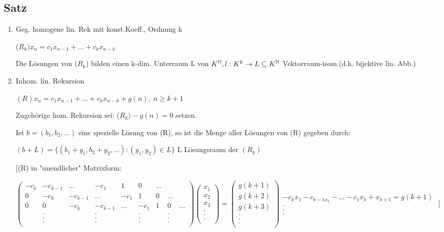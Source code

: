 \subsection{Satz} %
\begin{enumerate}
	\item Geg. homogene lin. Rek mit konst.Koeff., Ordnung k
	
	($R_k) x_n=c_1x_{n-1}+...+c_kx_{n-k}$
	
	Die Lösungen von ($R_k$) bilden einen k-dim. Unterraum L von $K^{\operatorname{\mathbb{N}}}, l:K^k \rightarrow L \subseteq K^{\operatorname{\mathbb{N}}} $ Vektorraum-isom.(d.h. bijektive lin. Abb.)
	
	\item Inhom. lin. Rekursion
	
	$(R)x_n=c_1x_{n-1}+...+c_kx_{n-k}+g(n),~ n\geq k+1$
	
	Zugehörige hom. Rekursion sei: ($R_k)-g(n)=0$ setzen.
	
	Ist $b=(b_1,b_2,...)$ eine spezielle Lösung von (R), so ist die Menge aller Lösungen von (R) gegeben durch:
	
	$(b+L)=\{(b_1+y_1,b_2+y_2,...):(y_1,y_2) \in L \}$ \qquad L Lösungsraum der $(R_k)$
	
	[(R) in "unendlicher" Matrixform:
	
	$\begin{pmatrix}
	-c_k & -c_{k-1} & ... & -c_1 & 1 & 0 &... & & \\
	0&-c_k & -c_{k-1} & ... & -c_1 & 1 & 0 &... &\\
	0&0&-c_k & -c_{k-1} & ... & -c_1 & 1 & 0 &... \\
	&.&&.&&.&&.&\\
	&.&&.&&.&&.&\\
	&.&&.&&.&&.&\\
	\end{pmatrix}
	\begin{pmatrix}
	x_1\\
	x_2\\
	x_3\\
	.\\
	.\\
	.\\
	\end{pmatrix} = 
	\begin{pmatrix}
	g(k+1)\\
	g(k+2)\\
	g(k+3)\\
	.\\
	.\\
	.\\
	\end{pmatrix}
	\begin{matrix}
	-c_kx_1-c_{k-1x_2}-...-c_1x_k+x_{k+1}= g(k+1)\\
	.\\
	.\\
	.
	\end{matrix}$
	]
\end{enumerate}
